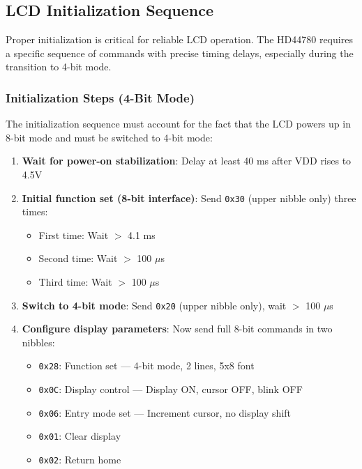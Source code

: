 \subsection{LCD Initialization Sequence}

Proper initialization is critical for reliable LCD operation. The HD44780 requires a specific sequence of commands with precise timing delays, especially during the transition to 4-bit mode.

\subsubsection{Initialization Steps (4-Bit Mode)}

The initialization sequence must account for the fact that the LCD powers up in 8-bit mode and must be switched to 4-bit mode:

\begin{enumerate}[nosep]
  \item \textbf{Wait for power-on stabilization}: Delay at least 40 ms after VDD rises to 4.5V
  \item \textbf{Initial function set (8-bit interface)}: Send \texttt{0x30} (upper nibble only) three times:
    \begin{itemize}[nosep]
      \item First time: Wait $>$ 4.1 ms
      \item Second time: Wait $>$ 100 $\mu$s
      \item Third time: Wait $>$ 100 $\mu$s
    \end{itemize}
  \item \textbf{Switch to 4-bit mode}: Send \texttt{0x20} (upper nibble only), wait $>$ 100 $\mu$s
  \item \textbf{Configure display parameters}: Now send full 8-bit commands in two nibbles:
    \begin{itemize}[nosep]
      \item \texttt{0x28}: Function set — 4-bit mode, 2 lines, 5x8 font
      \item \texttt{0x0C}: Display control — Display ON, cursor OFF, blink OFF
      \item \texttt{0x06}: Entry mode set — Increment cursor, no display shift
      \item \texttt{0x01}: Clear display
      \item \texttt{0x02}: Return home
    \end{itemize}
\end{enumerate}

